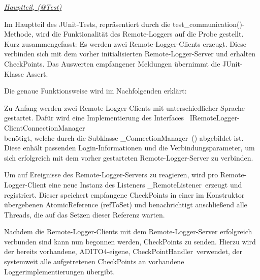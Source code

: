 \vspace{5px}
\par \textit{\underline{Hauptteil, (@Test)}}
\par Im Hauptteil des JUnit-Tests, repräsentiert durch die \glqq test\_communication()\grqq-Methode, wird die Funktionalität des Remote-Loggers auf die Probe gestellt. \\
Kurz zusammengefasst: Es werden zwei Remote-Logger-Clients erzeugt. Diese verbinden sich mit dem vorher initialisierten Remote-Logger-Server und erhalten CheckPoints. Das Auswerten empfangener Meldungen übernimmt die JUnit-Klasse \glqq Assert\grqq. 

\par Die genaue Funktionsweise wird im Nachfolgenden erklärt:


\par Zu Anfang werden zwei Remote-Logger-Clients mit unterschiedlicher Sprache gestartet. Dafür wird eine Implementierung des Interfaces \grqq\ IRemoteLogger-ClientConnectionManager\grqq \\ benötigt, welche durch die Subklasse \glqq \_ConnectionManager\grqq\ () abgebildet ist. 
Diese enhält passenden Login-Informationen und die Verbindungsparameter, um sich erfolgreich mit dem vorher gestarteten Remote-Logger-Server zu verbinden. 


Um auf Ereignisse des Remote-Logger-Servers zu reagieren, wird pro Remote-Logger-Client eine neue Instanz des Listeners \glqq \_RemoteListener\grqq\ erzeugt und registriert. Dieser speichert empfangene CheckPoints in einer im Konstruktor übergebenen AtomicReference (\glqq refToSet\grqq) und benachrichtigt anschließend alle Threads, die auf das Setzen dieser Referenz warten.

 Nachdem die Remote-Logger-Clients mit dem Remote-Logger-Server erfolgreich verbunden sind kann nun begonnen werden, CheckPoints zu senden. Hierzu wird der bereits vorhandene, ADITO4-eigene, \glqq CheckPointHandler\grqq\ verwendet, der systemweit alle aufgetretenen CheckPoints an vorhandene Loggerimplementierungen übergibt. 

